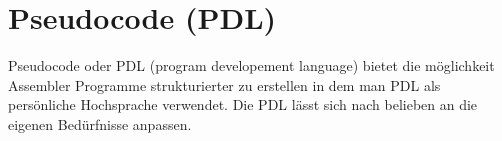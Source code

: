 \section{Pseudocode (PDL)}
Pseudocode oder PDL (program developement language) bietet die möglichkeit Assembler Programme strukturierter zu erstellen in dem man PDL als persönliche Hochsprache verwendet.
Die PDL lässt sich nach belieben an die eigenen Bedürfnisse anpassen.